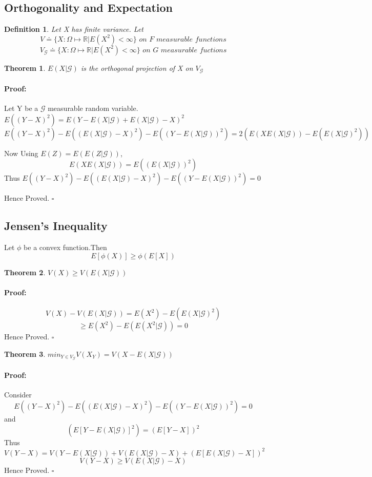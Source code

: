 \documentclass{article}
\newenvironment{proof}{\paragraph{Proof:}}{\hfill$\square$}
\newtheorem{definition}{Definition}[section]
\newtheorem{theorem}{Theorem}[section]
\begin{document}
\subsection{Orthogonality and Expectation}
\begin{definition}
    Let X has finite variance. Let\[ V \doteq \{ X: \Omega \mapsto \mathbb{R}|E(X^2)<\infty \} \textit{ on F measurable functions}\] \[ V_\mathcal{G} \doteq \{ X: \Omega \mapsto \mathbb{R}|E(X^2)<\infty \} \textit{ on G measurable fuctions} \]
\end{definition}
\begin{theorem}
    $E(X|\mathcal{G} )$ is the orthogonal projection of X on $V_\mathcal{G} $
\end{theorem}
\begin{proof}
    Let Y be a $\mathcal{G} $ measurable random variable.\\
    $E((Y-X)^2) = E(Y-E(X|\mathcal{G} )+E(X|\mathcal{G} ) -X)^2$\\
    $E((Y-X)^2) - E((E(X|\mathcal{G})-X)^2) - E((Y - E(X|\mathcal{G} ))^2)= 2(E(XE(X|\mathcal{G} )) - E(E(X|\mathcal{G} )^2)) $

Now Using $E(Z) = E(E(Z|\mathcal{G}))$, \\
\[  E(XE(X|\mathcal{G} )) = E((E(X|\mathcal{G} ))^2)  \]
Thus $E((Y-X)^2) - E((E(X|\mathcal{G})-X)^2) - E((Y - E(X|\mathcal{G} ))^2) = 0$

Hence Proved.
\end{proof}
\subsection{Jensen's Inequality}
Let $\phi $ be a convex function.Then \[ E[\phi(X)] \geq \phi(E[X])\] 
\begin{theorem}
    $V(X)\geq V(E(X|\mathcal{G} )) $
\end{theorem}
\begin{proof}
    $$V(X)- V(E(X|\mathcal{G} )) = E(X^2) - E(E(X|\mathcal{G} )^2)$$
$$\geq E(X^2) - E(E(X^2|\mathcal{G} )) = 0$$
Hence Proved.
\end{proof}
\begin{theorem}
    $min_{Y \in V_\mathcal{G}} V(X_Y) = V(X-E(X|\mathcal{G})) $
\end{theorem}
\begin{proof}
    Consider \[ E((Y-X)^2) - E((E(X|\mathcal{G})-X)^2) - E((Y - E(X|\mathcal{G} ))^2) = 0 \]
and\[ (E[Y-E(X|\mathcal{G} )]^2) = (E[Y-X])^2 \]
Thus \[ V(Y-X) = V(Y-E(X|\mathcal{G} )) + V(E(X|\mathcal{G} )-X) + (E[E(X|\mathcal{G} )-X])^2 \]
\[ V(Y-X) \geq V(E(X|\mathcal{G} )-X)  \]
Hence Proved.
\end{proof}
\end{document}
